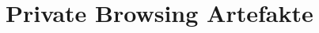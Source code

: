 \begin{comment}
Beispiel: Web Attacker Angriffe:
	> IP-Angriffe \cite{Perdices.2023}
		•	Obwohl Nutzer Verschlüsselung oder VPNs nutzen, ist ihre Privatsphäre oft ungeschützt, da mehrere Domains gleichzeitig besucht werden oder IP-Adressen von Cloud-Providern geteilt werden.
		•	Eine neue Methode zur Identifizierung von Web-Browsing wird vorgestellt, die nur auf den IP-Adressen basiert, mit denen der Nutzer verbunden war, ohne DNS Reverse-Resolution durchzuführen.
		•	Diese IP-Adresse-Sequenz wird in verschiedene Deep Learning Modelle eingespeist, um die tatsächlich besuchte Website zu identifizieren.
		•	Untersucht wurden auch andere Faktoren wie Abhängigkeit vom DNS-Server, Genauigkeit bei Top-Domains, Datenverstärkung durch Paket-Sampling-Simulation, Auswirkungen auf Paket-Sampling und Skalierbarkeit der Methode.
		•	Mit nur 10\% der Pakete konnte die besuchte Website mit einer Genauigkeit und F1-Score von 94\% bis 95\% identifiziert werden.
	> ISP als „Web attacker“, um Kundenaktivität zu verfolgen \cite{Aggarwal.2010}
		•	ISP können unsere Ergebnisse nutzen, um den Datenverkehr ihrer Kunden zu identifizieren.
		•	Dies ermöglicht ISP, Daten für Marketingzwecke zu monetarisieren, sofern sie anonymisiert und mit Zustimmung der Kunden erfolgt.
		•	ISP müssen jedoch darauf achten, wer Zugriff auf Netzwerkverkehrsdaten hat.
		•	Das Weitergeben dieser Daten an Dritte kann zu potenziellen Datenschutzverletzungen bei Kunden führen.
		•	Hauptaufgabe ist eigentlich einfach, aber es können viele Komplikationen auftreten
		•	Hauptproblem ist das sogenannte "verwickelte Netz"
		•	Beim Verbinden mit einer Website muss der Webbrowser eine Kaskade von Verbindungen zu anderen Websites öffnen
		•	Grund dafür sind Bilder, Anzeigen, Banner, JavaScript-Bibliotheken, Social-Media-Links und vieles mehr
		

\end{comment}



\section{Private Browsing Artefakte} %



